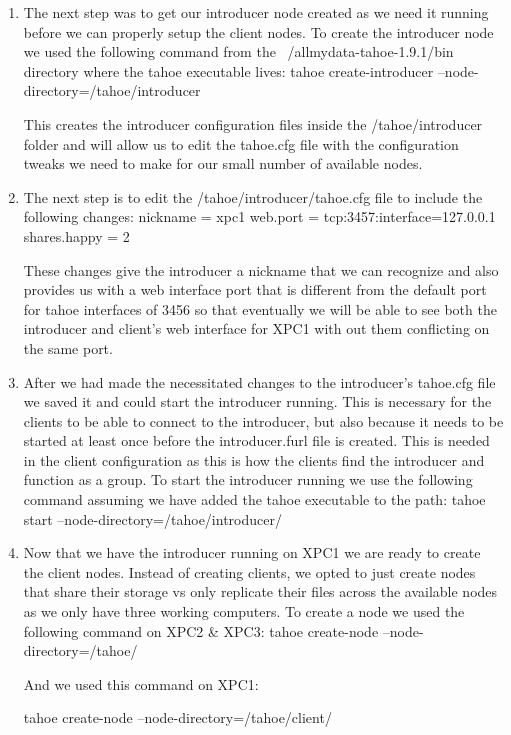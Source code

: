 \documentclass[11pt]{article}
\begin{document}
\begin{enumerate}
\item The next step was to get our introducer node created as we need it running before we can properly setup the client nodes. To create the introducer node we used the following command from the ~/allmydata-tahoe-1.9.1/bin directory where the tahoe executable lives:
\subitem tahoe create-introducer --node-directory=/tahoe/introducer

This creates the introducer configuration files inside the /tahoe/introducer folder and will allow us to edit the tahoe.cfg file with the configuration tweaks we need to make for our small number of available nodes. 
\item The next step is to edit the /tahoe/introducer/tahoe.cfg file to include the following changes:
\subitem nickname = xpc1
\subitem web.port = tcp:3457:interface=127.0.0.1
\subitem shares.happy = 2

These changes give the introducer a nickname that we can recognize and also provides us with a web interface port that is different from the default port for tahoe interfaces of 3456 so that eventually we will be able to see both the introducer and client's web interface for XPC1 with out them conflicting on the same port.

\item After we had made the necessitated changes to the introducer's tahoe.cfg file we saved it and could start the introducer running. This is necessary for the clients to be able to connect to the introducer, but also because it needs to be started at least once before the introducer.furl file is created. This is needed in the client configuration as this is how the clients find the introducer and function as a group. To start the introducer running we use the following command assuming we have added the tahoe executable to the path:
\subitem tahoe start --node-directory=/tahoe/introducer/

\item Now that we have the introducer running on XPC1 we are ready to create the client nodes. Instead of creating clients, we opted to just create nodes that share their storage vs only replicate their files across the available nodes as we only have three working computers. To create a node we used the following command on XPC2 \& XPC3:
\subitem tahoe create-node --node-directory=/tahoe/

And we used this command on XPC1:

\subitem tahoe create-node --node-directory=/tahoe/client/


\end{enumerate}
\end{document}
